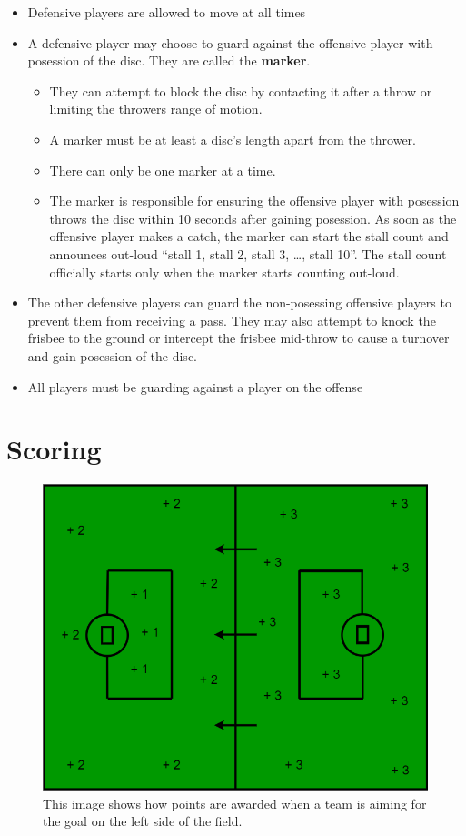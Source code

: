 \documentclass[10pt]{article}
\begin{document}
\begin{itemize}
    \item Defensive players are allowed to move at all times
    \item A defensive player may choose to guard against the offensive player with posession of the disc. They are called the \textbf{marker}. 
    \begin{itemize}
        \item They can attempt to block the disc by contacting it after a throw or limiting the throwers range of motion.
        \item A marker must be at least a disc's length apart from the thrower.
        \item There can only be one marker at a time.
        \item The marker is responsible for ensuring the offensive player with posession throws the disc within 10 seconds after gaining posession. As soon as the offensive player makes a catch, the marker can start the stall count and announces out-loud ``stall 1, stall 2, stall 3, \ldots, stall 10''. The stall count officially starts only when the marker starts counting out-loud.
    \end{itemize}
    \item The other defensive players can guard the non-posessing offensive players to prevent them from receiving a pass. They may also attempt to knock the frisbee to the ground or intercept the frisbee mid-throw to cause a turnover and gain posession of the disc.
    \item All players must be guarding against a player on the offense 
\end{itemize}

\section{Scoring}

\begin{figure}[H]

    \includegraphics[width=.75\textwidth]{field/field_points}
    \caption{This image shows how points are awarded when a team is aiming for the goal on the left side of the field.}

\end{figure}
\end{document}
